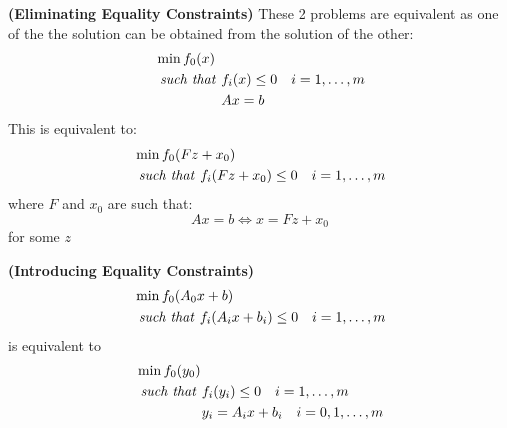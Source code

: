 \begin{proposition}{\textbf{(Eliminating Equality Constraints)}}
    These 2 problems are equivalent as one of the the solution can be obtained from the solution of the other:
    \begin{equation*}
    \begin{aligned}
        &\min f_0(x) \\
        &\text{\emph{ such that }} \begin{aligned}[t]
            &f_i(x)\le0 \quad i=1,\dots,m \\
            &Ax=b\\
        \end{aligned}
    \end{aligned}
    \end{equation*}
    This is equivalent to:
    \begin{equation*}
    \begin{aligned}
        &\min f_0(Fz+x_0) \\
        &\text{\emph{ such that }} \begin{aligned}[t]
            &f_i(Fz+x_0)\le0 \quad i=1,\dots,m \\
        \end{aligned}
    \end{aligned}
    \end{equation*}
    where $F$ and $x_0$ are such that:
    \begin{equation*}
        Ax = b \iff x = Fz + x_0 
    \end{equation*}
    for some $z$
\end{proposition}

\begin{proposition}{\textbf{(Introducing Equality Constraints)}}
    \begin{equation*}
    \begin{aligned}
        &\min f_0(A_0x+b) \\
        &\text{\emph{ such that }} \begin{aligned}[t]
            &f_i(A_ix+b_i)\le0 \quad i=1,\dots,m \\
        \end{aligned}
    \end{aligned}
    \end{equation*}
    is equivalent to
    \begin{equation*}
    \begin{aligned}
        &\min f_0(y_0) \\
        &\text{\emph{ such that }} \begin{aligned}[t]
            &f_i(y_i)\le0 \quad i=1,\dots,m \\
            &y_i = A_ix+b_i \quad i=0,1,\dots,m
        \end{aligned}
    \end{aligned}
    \end{equation*}
\end{proposition}

